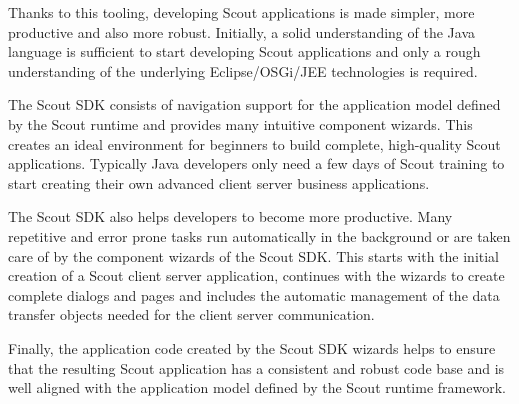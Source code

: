 %
Thanks to this tooling, developing Scout applications is made simpler, more productive and also more robust. 
Initially, a solid understanding of the Java language is sufficient to start developing Scout applications and only a rough understanding of the underlying Eclipse/OSGi/JEE technologies is required. 

The Scout SDK consists of navigation support for the application model defined by the Scout runtime and provides many intuitive component wizards. 
This creates an ideal environment for beginners to build complete, high-quality Scout applications. 
Typically Java developers only need a few days of Scout training to start creating their own advanced client server business applications. 

The Scout SDK also helps developers to become more productive.
Many repetitive and error prone tasks run automatically in the background or are taken care of by the component wizards of the Scout SDK. 
This starts with the initial creation of a Scout client server application, continues with the wizards to create complete dialogs and pages and includes the automatic management of the data transfer objects needed for the client server communication.

Finally, the application code created by the Scout SDK wizards helps to ensure that the resulting Scout application has a consistent and robust code base and is well aligned with the application model defined by the Scout runtime framework.
